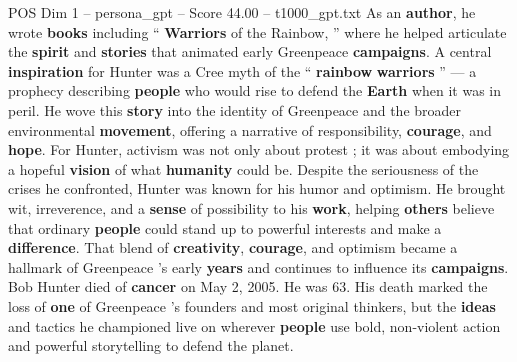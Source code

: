 \begin{textsample}{POS Dim 1 – persona\_gpt – Score 44.00 – t1000\_gpt.txt}
As an \textbf{author}, he wrote \textbf{books} including “ \textbf{Warriors} of the Rainbow, ” where he helped articulate the \textbf{spirit} and \textbf{stories} that animated early Greenpeace \textbf{campaigns}.
A central \textbf{inspiration} for Hunter was a Cree myth of the “ \textbf{rainbow} \textbf{warriors} ” — a prophecy describing \textbf{people} who would rise to defend the \textbf{Earth} when it was in peril.
He wove this \textbf{story} into the identity of Greenpeace and the broader environmental \textbf{movement}, offering a narrative of responsibility, \textbf{courage}, and \textbf{hope}.
For Hunter, activism was not only about protest ; it was about embodying a hopeful \textbf{vision} of what \textbf{humanity} could be.
Despite the seriousness of the crises he confronted, Hunter was known for his humor and optimism.
He brought wit, irreverence, and a \textbf{sense} of possibility to his \textbf{work}, helping \textbf{others} believe that ordinary \textbf{people} could stand up to powerful interests and make a \textbf{difference}.
That blend of \textbf{creativity}, \textbf{courage}, and optimism became a hallmark of Greenpeace ’s early \textbf{years} and continues to influence its \textbf{campaigns}.
Bob Hunter died of \textbf{cancer} on May 2, 2005.
He was 63.
His death marked the loss of \textbf{one} of Greenpeace ’s founders and most original thinkers, but the \textbf{ideas} and tactics he championed live on wherever \textbf{people} use bold, non-violent action and powerful storytelling to defend the planet.

\end{textsample}
